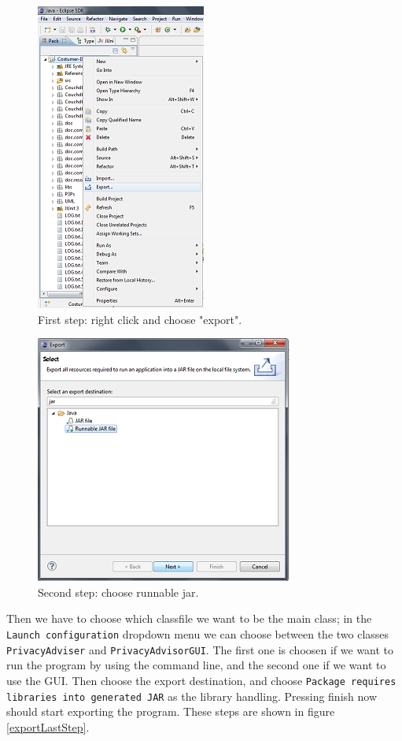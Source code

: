 \begin{centering}
  \begin{figure}
    \includegraphics{Documentation/export.png}
    \caption{First step: right click and choose "export".}
    \label{exportFirstStep}
  \end{figure}
\end{centering}

\begin{centering}
  \begin{figure}
    \includegraphics{Documentation/export_jar.png}
    \caption{Second step: choose runnable jar.}
    \label{exportSecondStep}
  \end{figure}
\end{centering}

Then we have to choose which classfile we want to be the main class; in the \texttt{Launch configuration} dropdown menu we can choose between the two classes \texttt{PrivacyAdviser} and \texttt{PrivacyAdvisorGUI}. The first one is choosen if we want to run the program by using the command line, and the second one if we want to use the GUI. Then choose the export destination, and choose \texttt{Package requires libraries into generated JAR} as the library handling. Pressing finish now should start exporting the program. These steps are shown in figure \ref{exportLastStep}.

